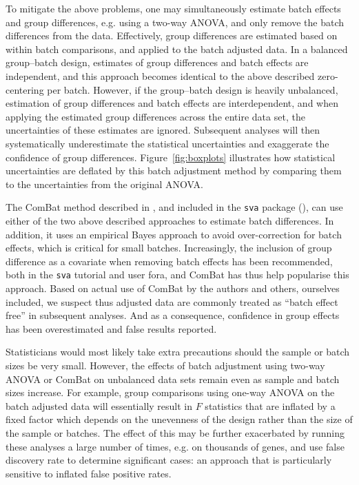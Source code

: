 \documentclass{bio}
\begin{document}
To mitigate the above problems, one may simultaneously estimate batch effects and group differences, e.g. using a two-way ANOVA, and only remove the batch differences from the data. Effectively, group differences are estimated based on within batch comparisons, and applied to the batch adjusted data. In a balanced group--batch design, estimates of group differences and batch effects are independent, and this approach becomes identical to the above described zero-centering per batch. However, if the group--batch design is heavily unbalanced, estimation of group differences and batch effects are interdependent, and when applying the estimated group differences across the entire data set, the uncertainties of these estimates are ignored. Subsequent analyses will then systematically underestimate the statistical uncertainties and exaggerate the confidence of group differences. Figure~\ref{fig:boxplots} illustrates how statistical uncertainties are deflated by this batch adjustment method by comparing them to the uncertainties from the original ANOVA.

The ComBat method described in \citet{Johnson2007}, and included in the \texttt{sva} package (\citealp{Leek2012}), can use either of the two above described approaches to estimate batch differences. In addition, it uses an empirical Bayes approach to avoid over-correction for batch effects, which is critical for small batches. Increasingly, the inclusion of group difference as a covariate when removing batch effects has been recommended, both in the \texttt{sva} tutorial and user fora, and ComBat has thus help popularise this approach. Based on actual use of ComBat by the authors and others, ourselves included, we suspect thus adjusted data are commonly treated as ``batch effect free'' in subsequent analyses. And as a consequence, confidence in group effects has been overestimated and false results reported.

Statisticians would most likely take extra precautions should the sample or batch sizes be very small. However, the effects of batch adjustment using two-way ANOVA or ComBat on unbalanced data sets remain even as sample and batch sizes increase. For example, group comparisons using one-way ANOVA on the batch adjusted data will essentially result in $F$ statistics that are inflated by a fixed factor which depends on the unevenness of the design rather than the size of the sample or batches. The effect of this may be further exacerbated by running these analyses a large number of times, e.g. on thousands of genes, and use false discovery rate to determine significant cases: an approach that is particularly sensitive to inflated false positive rates.
\end{document}
